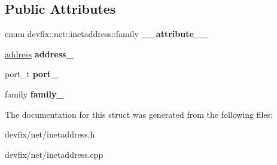 \subsection*{Public Attributes}
\begin{DoxyCompactItemize}
\item 
\mbox{\label{structdevfix_1_1net_1_1inetaddress_a3752ca3c3b6522ec4e1777287627cbe3}} 
enum devfix\+::net\+::inetaddress\+::family {\bfseries \+\_\+\+\_\+attribute\+\_\+\+\_\+}
\item 
\mbox{\label{structdevfix_1_1net_1_1inetaddress_a902c9b8140f7c1fad452ef9de7f86561}} 
\hyperlink{uniondevfix_1_1net_1_1inetaddress_1_1address}{address} {\bfseries address\+\_\+}
\item 
\mbox{\label{structdevfix_1_1net_1_1inetaddress_a3b666575020939365ebcec1d7aeb0f34}} 
port\+\_\+t {\bfseries port\+\_\+}
\item 
\mbox{\label{structdevfix_1_1net_1_1inetaddress_af025a2c8b37c28f5553f6f0c350d3765}} 
family {\bfseries family\+\_\+}
\end{DoxyCompactItemize}


The documentation for this struct was generated from the following files\+:\begin{DoxyCompactItemize}
\item 
devfix/net/inetaddress.\+h\item 
devfix/net/inetaddress.\+cpp\end{DoxyCompactItemize}
